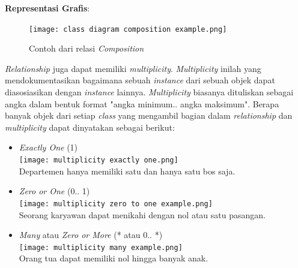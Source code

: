 \documentclass[a4paper]{article}
\begin{document}
\begin{enumerate}
\begin{itemize}
        \textbf{Representasi Grafis}:\\
        \begin{figure}[h]
            \centering
            \texttt{[image: class diagram composition example.png]}
            \caption{Contoh dari relasi \textit{Composition}}
        \end{figure}
    \end{itemize}
    \textit{Relationship} juga dapat memiliki \textit{multiplicity}. \textit{Multiplicity} inilah yang mendokumentasikan bagaimana sebuah \textit{instance} dari sebuah objek dapat diasosiasikan dengan \textit{instance} lainnya. \textit{Multiplicity} biasanya dituliskan sebagai angka dalam bentuk format "angka minimum.. angka maksimum"\autocite{systemanalysisdesign-class-diagram}. Berapa banyak objek dari setiap \textit{class} yang mengambil bagian dalam \textit{relationship} dan \textit{multiplicity} dapat dinyatakan sebagai berikut:
    \begin{itemize}
        \item \textit{Exactly One} (1)\\
            \texttt{[image: multiplicity exactly one.png]}\\
            Departemen hanya memiliki satu dan hanya satu bos saja.
        \item \textit{Zero or One} (0.. 1)\\
            \texttt{[image: multiplicity zero to one example.png]}\\
            Seorang karyawan dapat menikahi dengan nol atau satu pasangan.
        \item \textit{Many} atau \textit{Zero or More} (* atau 0.. *)\\
            \texttt{[image: multiplicity many example.png]}\\
            Orang tua dapat memiliki nol hingga banyak anak.

\end{itemize}
\end{enumerate}
\end{document}
